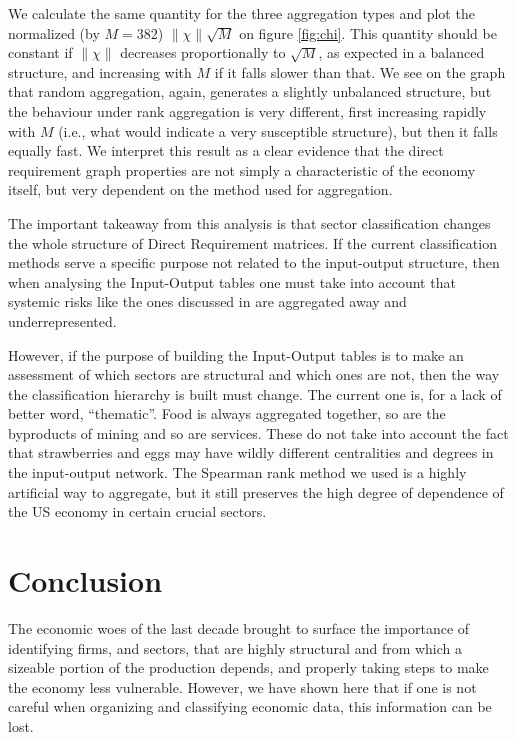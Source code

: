 We calculate the same quantity for the three aggregation types
and plot the normalized (by $M=382$) $\|\chi\|\sqrt{M}$ on figure
\ref{fig:chi}. This quantity should be constant if $\|\chi\|$ decreases
proportionally to $\sqrt{M}$, as expected in a balanced structure, and
increasing with $M$ if it falls slower than that. We see on the graph
that random aggregation, again, generates a slightly unbalanced
structure, but the behaviour under rank aggregation is very different,
first increasing rapidly with $M$ (i.e., what would indicate a very
susceptible structure), but then it falls equally fast. We interpret
this result as a clear evidence that the direct requirement graph
properties are not simply a characteristic of the economy itself, but
very dependent on the method used for aggregation.

The important takeaway from this analysis is that sector
classification changes the whole structure of Direct Requirement
matrices. If the current classification methods serve a specific
purpose not related to the input-output structure, then when analysing
the Input-Output tables one must take into account that systemic risks like the
ones discussed in \cite{Acemoglu12} are aggregated away and
underrepresented.

However, if the purpose of building the Input-Output tables is to
make an assessment of which sectors are structural and which ones are
not, then the way the classification
hierarchy is built must change. The current one is, for a lack of better word,
``thematic''. Food is always aggregated together, so are the byproducts of
mining and so are services. These do not take into account the fact
that strawberries and eggs may have wildly different centralities and
degrees in the input-output network. The Spearman rank method we used
is a highly artificial way to aggregate, but it still preserves the
high degree of dependence of the US economy in certain crucial sectors.


\section{Conclusion}

The economic woes of the last decade brought to surface the importance
of identifying firms, and sectors, that are highly structural and from
which a sizeable portion of the production depends, and properly taking
steps to make the economy less vulnerable. However, we have shown here
that if one is not careful when organizing and classifying economic
data, this information can be lost.

